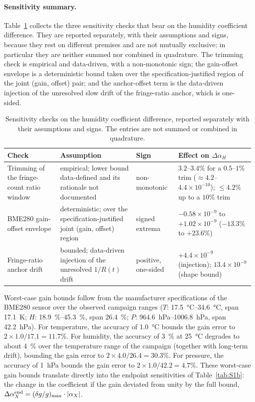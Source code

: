 \documentclass[aps,prapplied,reprint,superscriptaddress]{revtex4-2}
\begin{document}
\paragraph{Sensitivity summary.} Table~\ref{tab:S1d} collects the three sensitivity checks that bear on the humidity coefficient difference. They are reported separately, with their assumptions and signs, because they rest on different premises and are not mutually exclusive; in particular they are neither summed nor combined in quadrature. The trimming check is empirical and data-driven, with a non-monotonic sign; the gain-offset envelope is a deterministic bound taken over the specification-justified region of the joint (gain, offset) pair; and the anchor-offset term is the data-driven injection of the unresolved slow drift of the fringe-ratio anchor, which is one-sided.

\begin{table}[htbp]
\centering
\caption{Sensitivity checks on the humidity coefficient difference, reported separately with their assumptions and signs. The entries are not summed or combined in quadrature.}
\label{tab:S1d}
\begin{tabular}{p{}p{}p{}p{}}
\hline
Check & Assumption & Sign & Effect on $\Delta\alpha_H$ \\
\hline
Trimming of the fringe-count ratio window & empirical; lower bound data-defined and its rationale not documented & non-monotonic & $3.2$--$3.4\%$ for a $0.5$--$1\%$ trim ($\approx 4.2$--$4.4\times10^{-10}$); $\le 4.2\%$ up to a $10\%$ trim \\
BME280 gain-offset envelope & deterministic; over the specification-justified joint (gain, offset) region & signed extrema & $-0.58\times10^{-9}$ to $+1.02\times10^{-9}$ ($-13.3\%$ to $+23.6\%$) \\
Fringe-ratio anchor drift & bounded; data-driven injection of the unresolved $1/R(t)$ drift & positive, one-sided & $+4.4\times10^{-9}$ (injection); $13.4\times10^{-9}$ (shape bound) \\
\hline
\end{tabular}
\end{table}

Worst-case gain bounds follow from the manufacturer specifications of the BME280 sensor over the observed campaign ranges ($T$: \SIrange{17.5}{34.6}{\degreeCelsius}, span \SI{17.1}{\kelvin}; $H$: \SIrange{18.9}{45.3}{\percent}, span \SI{26.4}{\percent}; $P$: \SIrange{964.6}{1006.8}{\hecto\pascal}, span \SI{42.2}{\hecto\pascal}). For temperature, the accuracy of \SI{1.0}{\degreeCelsius} bounds the gain error to $2 \times 1.0/17.1 = 11.7\%$. For humidity, the accuracy of \SI{3}{\percent} at \SI{25}{\degreeCelsius} degrades to about \SI{4}{\percent} over the temperature range of the campaign (together with long-term drift), bounding the gain error to $2 \times 4.0/26.4 = 30.3\%$. For pressure, the accuracy of \SI{1}{\hecto\pascal} bounds the gain error to $2 \times 1.0/42.2 = 4.7\%$. These worst-case gain bounds translate directly into the endpoint sensitivities of Table~\ref{tab:S1b}: the change in the coefficient if the gain deviated from unity by the full bound, $\Delta\alpha_X^{\rm end} = (\delta g/g)_{\max} \cdot |\alpha_X|$.
\end{document}
